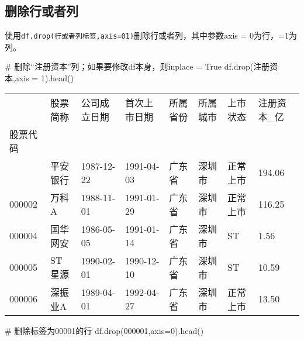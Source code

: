 \documentclass[
  letterpaper,
  DIV=11,
  numbers=noendperiod]{scrreprt}
\newenvironment{Shaded}{\begin{snugshade}}{\end{snugshade}}
\newcommand{\CommentTok}[1]{\textcolor[rgb]{0.37,0.37,0.37}{#1}}
\newcommand{\DecValTok}[1]{\textcolor[rgb]{0.68,0.00,0.00}{#1}}
\newcommand{\NormalTok}[1]{\textcolor[rgb]{0.00,0.23,0.31}{#1}}
\newcommand{\OperatorTok}[1]{\textcolor[rgb]{0.37,0.37,0.37}{#1}}
\newcommand{\StringTok}[1]{\textcolor[rgb]{0.13,0.47,0.30}{#1}}
\begin{document}
\hypertarget{ux5220ux9664ux884cux6216ux8005ux5217}{%
\subsection{删除行或者列}\label{ux5220ux9664ux884cux6216ux8005ux5217}}

使用\texttt{df.drop(行或者列标签,axis=0\textbar{}1)}删除行或者列，其中参数axis
= 0为行，=1为列。

\begin{Shaded}
\begin{Highlighting}[]
\CommentTok{\# 删除“注册资本”列；如果要修改df本身，则inplace = True}
\NormalTok{df.drop(}\StringTok{\textquotesingle{}注册资本\textquotesingle{}}\NormalTok{,axis }\OperatorTok{=} \DecValTok{1}\NormalTok{).head()}
\end{Highlighting}
\end{Shaded}

\begin{longtable}[]{@{}llllllll@{}}
\toprule\noalign{}
& 股票简称 & 公司成立日期 & 首次上市日期 & 所属省份 & 所属城市 &
上市状态 & 注册资本\_亿 \\
股票代码 & & & & & & & \\
\midrule\noalign{}
\endhead
\bottomrule\noalign{}
\endlastfoot
000001 & 平安银行 & 1987-12-22 & 1991-04-03 & 广东省 & 深圳市 & 正常上市
& 194.06 \\
000002 & 万科A & 1988-11-01 & 1991-01-29 & 广东省 & 深圳市 & 正常上市 &
116.25 \\
000004 & 国华网安 & 1986-05-05 & 1991-01-14 & 广东省 & 深圳市 & ST &
1.56 \\
000005 & ST 星源 & 1990-02-01 & 1990-12-10 & 广东省 & 深圳市 & ST &
10.59 \\
000006 & 深振业A & 1989-04-01 & 1992-04-27 & 广东省 & 深圳市 & 正常上市
& 13.50 \\
\end{longtable}

\begin{Shaded}
\begin{Highlighting}[]
\CommentTok{\# 删除标签为00001的行}
\NormalTok{df.drop(}\StringTok{\textquotesingle{}000001\textquotesingle{}}\NormalTok{,axis}\OperatorTok{=}\DecValTok{0}\NormalTok{).head()}
\end{Highlighting}
\end{Shaded}
\end{document}
